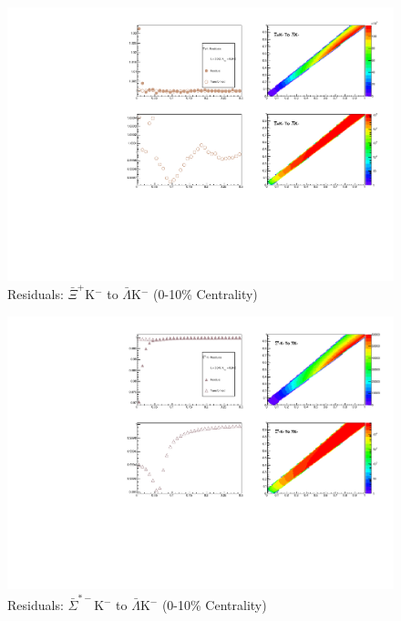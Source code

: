 \documentclass[../AnalysisNoteJBuxton.tex]{subfiles}
\begin{document}
\begin{figure}[h]
  \centering
  \includegraphics[width=\textwidth]{9_AdditionalFigures/Figures/Residuals/ALamKchM/Residuals_ALamKchM_0010_AXiKchM_MomResCrctn_NonFlatBgdCrctn_ResidualsIncluded_UsingCoulombOnlyInterpCfs.pdf}
  \caption[Residuals: $\bar{\Xi}^{+}$K$^{-}$ to $\bar{\Lambda}$K$^{-}$ (0-10\% Centrality)]{Residuals: $\bar{\Xi}^{+}$K$^{-}$ to $\bar{\Lambda}$K$^{-}$ (0-10\% Centrality)}
  \label{fig:Res_ALamKchM_0010_AXiCKchM}
\end{figure}


\begin{figure}[h]
  \centering
  \includegraphics[width=\textwidth]{9_AdditionalFigures/Figures/Residuals/ALamKchM/Residuals_ALamKchM_0010_ASigStMKchM_MomResCrctn_NonFlatBgdCrctn_ResidualsIncluded_UsingCoulombOnlyInterpCfs.pdf}
  \caption[Residuals: $\bar{\Sigma}^{*-}$K$^{-}$ to $\bar{\Lambda}$K$^{-}$ (0-10\% Centrality)]{Residuals: $\bar{\Sigma}^{*-}$K$^{-}$ to $\bar{\Lambda}$K$^{-}$ (0-10\% Centrality)}
  \label{fig:Res_ALamKchM_0010_ASigStMKchM}
\end{figure}
\end{document}
